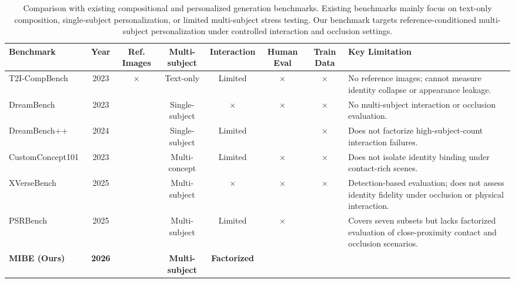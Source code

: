 \documentclass{article}
\newcommand{\cmark}{\checkmark}
\newcommand{\xmark}{$\times$}
\begin{document}
\begin{table}[t]
\centering
\scriptsize
\setlength{\tabcolsep}{4pt}
\begin{tabular}{l c ccccc p{2.8cm}}
\toprule
\textbf{Benchmark} 
& \textbf{Year}
& \textbf{Ref. Images} 
& \textbf{Multi-subject} 
& \textbf{Interaction} 
& \textbf{Human Eval} 
& \textbf{Train Data}
& \textbf{Key Limitation} \\
\midrule
T2I-CompBench~\cite{huang2023t2i}
& 2023 & \xmark & Text-only & Limited & \xmark & \xmark
& No reference images; cannot measure identity collapse or appearance leakage. \\
\addlinespace[2pt]
DreamBench~\cite{ruiz2023dreambooth}
& 2023 & \cmark & Single-subject & \xmark & \xmark & \xmark
& No multi-subject interaction or occlusion evaluation. \\
\addlinespace[2pt]
DreamBench++~\cite{peng2024dreambench}
& 2024 & \cmark & Single-subject & Limited & \cmark & \xmark
& Does not factorize high-subject-count interaction failures. \\
\addlinespace[2pt]
CustomConcept101~\cite{kumari2023multi}
& 2023 & \cmark & Multi-concept & Limited & \xmark & \xmark
& Does not isolate identity binding under contact-rich scenes. \\
\addlinespace[2pt]
XVerseBench~\cite{chen2025xverse}
& 2025 & \cmark & Multi-subject & \xmark & \xmark & \xmark
& Detection-based evaluation; does not assess identity fidelity under occlusion or physical interaction. \\
\addlinespace[2pt]
PSRBench~\cite{wang2025psr}
& 2025 & \cmark & Multi-subject & Limited & \xmark & \cmark
& Covers seven subsets but lacks factorized evaluation of close-proximity contact and occlusion scenarios. \\
\midrule
\textbf{MIBE (Ours)}
& \textbf{2026} & \cmark & \textbf{Multi-subject} & \textbf{Factorized} & \cmark & \cmark
& \\
\bottomrule
\end{tabular}
\caption{Comparison with existing compositional and personalized generation benchmarks. Existing
benchmarks mainly focus on text-only composition, single-subject personalization, or limited multi-subject stress testing. Our benchmark targets reference-conditioned multi-subject personalization under controlled interaction and occlusion settings.}
\label{tab:benchmark_comparison}
\end{table}
\end{document}
